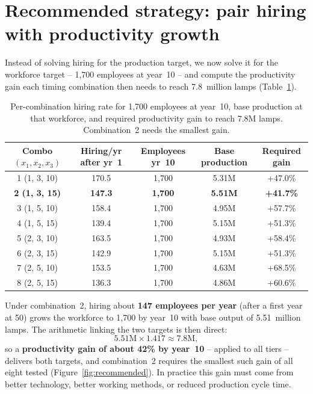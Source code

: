 \documentclass[11pt,a4paper]{article}
\begin{document}
\section{Recommended strategy: pair hiring with productivity growth}
Instead of solving hiring for the production target, we now solve it for the
workforce target -- 1,700 employees at year~10 -- and compute the
productivity gain each timing combination then needs to reach 7.8~million
lamps (Table~\ref{tab:gain}).

\begin{table}[h]
    \centering
    \caption{Per-combination hiring rate for 1,700 employees at year~10, base
    production at that workforce, and required productivity gain to reach
    7.8M lamps. Combination~2 needs the smallest gain.}
    \label{tab:gain}
    \begin{tabular}{ccccc}
        \toprule
        Combo $(x_1,x_2,x_3)$ & Hiring/yr after yr~1 & Employees yr~10 &
            Base production & Required gain \\
        \midrule
        1 (1, 3, 10)  & 170.5 & 1,700 & 5.31M & +47.0\% \\
        \textbf{2 (1, 3, 15)} & \textbf{147.3} & \textbf{1,700} &
            \textbf{5.51M} & \textbf{+41.7\%} \\
        3 (1, 5, 10)  & 158.4 & 1,700 & 4.95M & +57.7\% \\
        4 (1, 5, 15)  & 139.4 & 1,700 & 5.15M & +51.3\% \\
        5 (2, 3, 10)  & 163.5 & 1,700 & 4.93M & +58.4\% \\
        6 (2, 3, 15)  & 142.9 & 1,700 & 5.15M & +51.3\% \\
        7 (2, 5, 10)  & 153.5 & 1,700 & 4.63M & +68.5\% \\
        8 (2, 5, 15)  & 136.3 & 1,700 & 4.86M & +60.6\% \\
        \bottomrule
    \end{tabular}
\end{table}

Under combination~2, hiring about \textbf{147 employees per year} (after a
first year at 50) grows the workforce to 1,700 by year~10 with base output
of 5.51~million lamps. The arithmetic linking the two targets is then direct:
\begin{equation*}
    5.51\text{M} \times 1.417 \approx 7.8\text{M},
\end{equation*}
so a \textbf{productivity gain of about 42\% by year~10} -- applied to all
tiers -- delivers both targets, and combination~2 requires the smallest such
gain of all eight tested (Figure~\ref{fig:recommended}). In practice this
gain must come from better technology, better working methods, or reduced
production cycle time.
\end{document}
